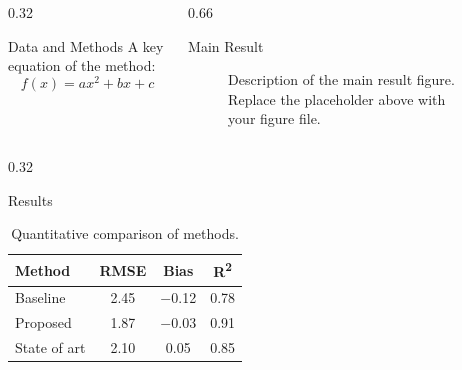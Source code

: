 \documentclass[final]{beamer}
\begin{document}
\begin{frame}{}
\begin{columns}[T]
\begin{column}{0.32\linewidth}
\begin{clsblock}{Data and Methods}
      A key equation of the method:
      \begin{equation}
        f(x) = ax^2 + bx + c
      \end{equation}
    \end{clsblock}
  \end{column}

  \begin{column}{0.66\linewidth}
    \begin{clshighlight}{Main Result}
      \begin{figure}
        \centering
        \caption{%
          Description of the main result figure.
          Replace the placeholder above with your figure file.%
        }
      \end{figure}
    \end{clshighlight}
  \end{column}

\end{columns}

\vspace{0.4cm}

\begin{columns}[T]

  \begin{column}{0.32\linewidth}
    \begin{clsblock}{Results}
      \centering
      \begin{table}
        \begin{tabular}{lccc}
          \toprule
          \textbf{Method} & \textbf{RMSE} & \textbf{Bias} & \textbf{R\textsuperscript{2}} \\
          \midrule
          Baseline     & 2.45 & $-$0.12 & 0.78 \\
          Proposed     & 1.87 & $-$0.03 & 0.91 \\
          State of art & 2.10 &    0.05 & 0.85 \\
          \bottomrule
        \end{tabular}
        \caption{Quantitative comparison of methods.}
      \end{table}


\end{clsblock}
\end{column}
\end{columns}
\end{frame}
\end{document}
